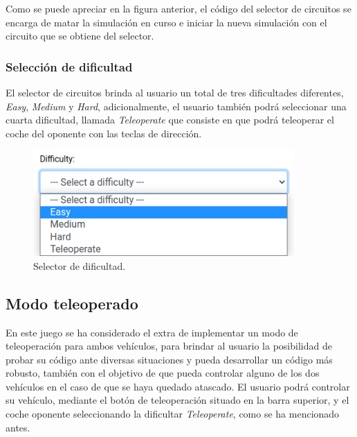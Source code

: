 \documentclass[a4paper, 12pt]{book}
\begin{document}
Como se puede apreciar en la figura anterior, el código del selector de circuitos se encarga de matar la simulación en curso e iniciar la nueva simulación con el circuito que se obtiene del selector.

\subsubsection{Selección de dificultad}
\label{subsec:follow_line_game_circuito}

El selector de circuitos brinda al usuario un total de tres dificultades diferentes, \emph{Easy}, \emph{Medium} y \emph{Hard}, adicionalmente, el usuario también podrá seleccionar una cuarta dificultad, llamada \emph{Teleoperate} que consiste en que podrá teleoperar el coche del oponente con las teclas de dirección.

\begin{figure}[H]
	\centering
    \includegraphics[width=10cm]{img/difficulty_selector.png}
    \caption{Selector de dificultad.}
    \label{figura:difficulty_selector}
\end{figure}

\subsection{Modo teleoperado}
\label{follow_line_game_mode_teleoperado}

En este juego se ha considerado el extra de implementar un modo de teleoperación para ambos vehículos, para brindar al usuario la posibilidad de probar su código ante diversas situaciones y pueda desarrollar un código más robusto, también con el objetivo de que pueda controlar alguno de los dos vehículos en el caso de que se haya quedado atascado. El usuario podrá controlar su vehículo, mediante el botón de teleoperación situado en la barra superior, y el coche oponente seleccionando la dificultar \emph{Teleoperate}, como se ha mencionado antes.
\end{document}
